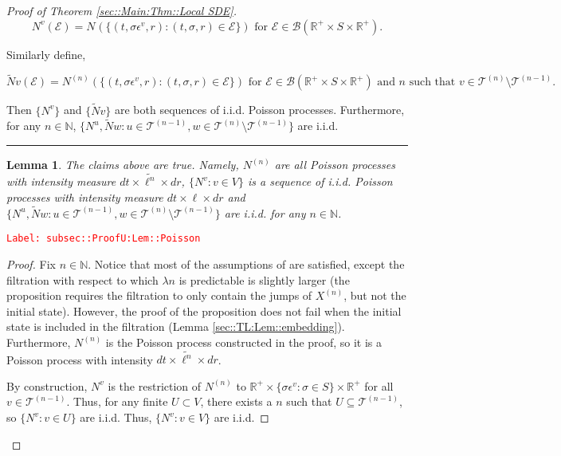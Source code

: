 \documentclass[12pt]{article}
\newcommand{\mb}{\mathbb}
\newcommand{\mc}{\mathcal}
\newcommand{\ms}{\mathscr}
\newcommand{\te}{\text}
\newcommand{\ep}{\epsilon}
\newcommand{\tr}{\textcolor{red}}
\newcommand{\labe}[1]{\tr{\texttt{Label: #1}}}
\newcommand{\ind}{\hspace{24pt}}
\newcommand{\lin}{\rule{\linewidth}{0.4 pt}}
\renewcommand{\v}{v}							%
\newcommand{\vv}{u}								%
\newcommand{\vvv}{w}							%
\renewcommand{\U}{U}							%
\renewcommand{\S}{S}							%
\newcommand{\s}{\sigma}							%
\newcommand{\ev}{\ep}							%
\renewcommand{\t}{t}							%
\newcommand{\X}{X}								%
\newcommand{\vind}[1]{^{#1}}					%
\newcommand{\cind}[1]{_{#1}}					%
\newcommand{\tip}[1]{#1}						%
\newcommand{\tree}{\mc{T}}						%
\newcommand{\sln}[1]{^{(#1)}}					%
\newcommand{\poiss}{N}							%
\newcommand{\Sm}{\ell}							%
\newcommand{\rate}{\lambda}						%
\renewcommand{\r}{r}							%
\newcommand{\alt}[1]{\widetilde{#1}}			%
\newcommand{\evnt}{\mc{E}}						%
\newtheorem{lem}[thms]{Lemma}
\begin{document}
\begin{proof}[Proof of Theorem \ref{sec::Main:Thm::Local SDE}]
\[\poiss\vind{\v}(\evnt{}) = \poiss\vind{}\left(\{(\t,\s\ev\vind{\v},\r):(\t,\s,\r)\in \evnt{}\}\right) \te{ for } \evnt{} \in \ms{B}(\mb{R}^+\times\S\times\mb{R}^+).\]

Similarly define,

\[\alt{\poiss}{\v}(\evnt{}) = \poiss\sln{n}\left(\{(\t,\s\ev\vind{\v},\r):(\t,\s,\r)\in \evnt{}\}\right)\te{ for } \evnt{} \in \ms{B}(\mb{R}^+\times\S\times\mb{R}^+)\te{ and }n\te{ such that } \v\in \tree\sln{n}\setminus\tree\sln{n-1}.\]

Then \(\{\poiss\vind{\v}\}\) and \(\{\alt{\poiss}{\v}\}\) are both sequences of i.i.d. Poisson processes. Furthermore, for any \(n \in \mb{N}\), \(\{\poiss\vind{\vv},\alt{\poiss}{\vvv}:\vv\in \tree\sln{n-1},\vvv\in\tree\sln{n}\setminus\tree\sln{n-1}\}\) are i.i.d.

\lin

\begin{lem}
The claims above are true. Namely, \(\poiss\sln{n}\) are all Poisson processes with intensity measure \(d\t\times\alt{\Sm^{n}}\times d\r\), \(\{\poiss\vind{\v}:\v\in V\}\) is a sequence of i.i.d. Poisson processes with intensity measure \(d\t\times\Sm\times d\r\) and \(\{\poiss\vind{\vv},\alt{\poiss}{\vvv}:\vv\in \tree\sln{n-1},\vvv\in\tree\sln{n}\setminus\tree\sln{n-1}\}\) are i.i.d. for any \(n \in \mb{N}\).

\label{subsec::ProofU:Lem::Poisson}
\end{lem}
\labe{subsec::ProofU:Lem::Poisson}
\begin{proof}

Fix \(n \in \mb{N}\). Notice that most of the assumptions of \cite[Proposition 14.7.I(b)]{DalVer08} are satisfied, except the filtration with respect to which \(\rate{n}\) is predictable is slightly larger (the proposition requires the filtration to only contain the jumps of \(\X\sln{n}\cind{}\tip{}\), but not the initial state). However, the proof of the proposition does not fail when the initial state is included in the filtration (Lemma \ref{sec::TL:Lem::embedding}). Furthermore, \(\poiss\sln{n}\) is the Poisson process constructed in the proof, so it is a Poisson process with intensity \(d\t\times \alt{\Sm^n}\times d\r\).

\ind By construction, \(\poiss\vind{\v}\) is the restriction of \(\poiss\sln{n}\) to \(\mb{R}^+ \times \{\s\ev\vind{\v}: \s\in \S\}\times \mb{R}^+\) for all \(\v\in \tree\sln{n-1}\). Thus, for any finite \(\U \subset V\), there exists a \(n\) such that \(\U \subseteq \tree\sln{n-1}\), so \(\{\poiss\vind{\v}: \v\in \U\}\) are i.i.d. Thus, \(\{\poiss\vind{\v}: \v\in V\}\) are i.i.d.


\end{proof}
\end{proof}
\end{document}
